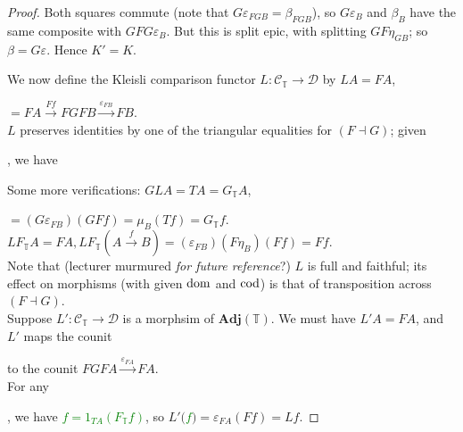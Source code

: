 \documentclass[a4paper]{article}
\begin{document}
\begin{thm}
\begin{proof}
        Both squares commute (note that $G\varepsilon_{FGB} = \beta_{FGB}$), so $G\varepsilon_B$ and $\beta_B$ have the same composite with $GFG\varepsilon_B$. But this is split epic, with splitting $GF\eta_{GB}$; so $\beta = G\varepsilon$. Hence $K' = K$.

        We now define the Kleisli comparison functor $L:\mathcal{C}_\mathbb{T} \to \mathcal{D}$ by $LA = FA$, 
        $=FA\xrightarrow{Ff} FGFB \xrightarrow{\varepsilon_{FB}} FB$.\\
        $L$ preserves identities by one of the triangular equalities for $(F\dashv G)$; given
        , we have 


        Some more verifications: $GLA=TA=G_\mathbb{T}A$,
        $= (G\varepsilon_{FB}) (GFf) = \mu_B(Tf) = G_\mathbb{T}f$.\\
        $LF_\mathbb{T} A = FA, LF_\mathbb{T}(A\xrightarrow{f}B) = (\varepsilon_{FB})(F\eta_B) (Ff) = Ff$.\\
        Note that (lecturer murmured \emph{for future reference}?) $L$ is full and faithful; its effect on morphisms (with given $\operatorname{dom}$ and $\operatorname{cod}$) is that of transposition across $(F\dashv G)$.\\
        Suppose $L':\mathcal{C}_\mathbb{T} \to \mathcal{D}$ is a morphsim of $\mathbf{Adj}(\mathbb{T})$. We must have $L'A =FA$, and $L'$ maps the counit
        to the counit $FGFA \xrightarrow{\varepsilon_{FA}} FA$.\\
        For any
        , we have \textcolor{green}{$f=1_{TA}(F_\mathbb{T}f)$}, so $L'($\textcolor{green}{$f$}$) = \varepsilon_{FA} (Ff) = Lf$.
    \end{proof}
\end{thm}
\end{document}

